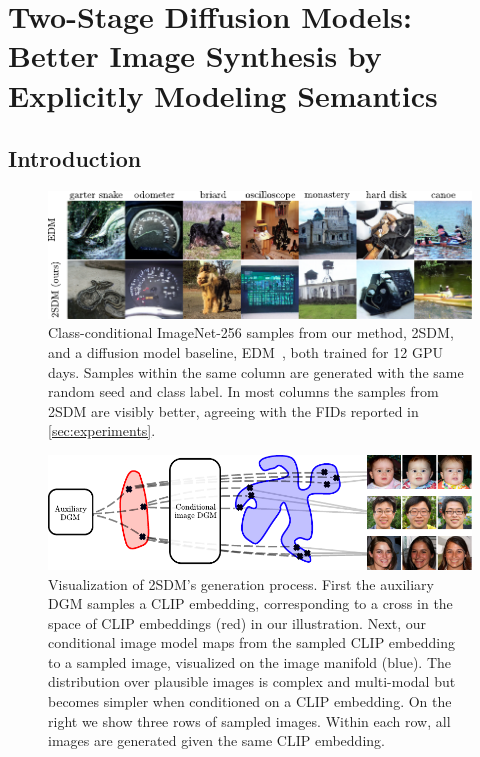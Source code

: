 \chapter{Two-Stage Diffusion Models:  Better Image Synthesis by Explicitly Modeling Semantics}

\section{Introduction}


\begin{figure}[b]
    \includegraphics[width=\textwidth]{figs/2sdm/2SDM-main-fig.pdf}
    \caption{Class-conditional ImageNet-256 samples from our method, 2SDM, and a diffusion model baseline, EDM~\citep{karras2022elucidating}, both trained for 12 GPU days. Samples within the same column are generated with the same random seed and class label. In most columns the samples from 2SDM are visibly better, agreeing with the FIDs reported in \cref{sec:experiments}.}
    \label{fig:latent-imagenet-samples}
\end{figure}


\begin{figure}[t]
    \centering
    \includegraphics{figs/2sdm/vcdm-diagram.pdf}
    \caption{Visualization of 2SDM's generation process. First the auxiliary DGM samples a CLIP embedding, corresponding to a cross in the space of CLIP embeddings (red) in our illustration. Next, our conditional image model maps from the sampled CLIP embedding to a sampled image, visualized on the image manifold (blue). The distribution over plausible images is complex and multi-modal but becomes simpler when conditioned on a CLIP embedding. On the right we show three rows of sampled images. Within each row, all images are generated given the same CLIP embedding.}
    \label{fig:samples}
\end{figure}


